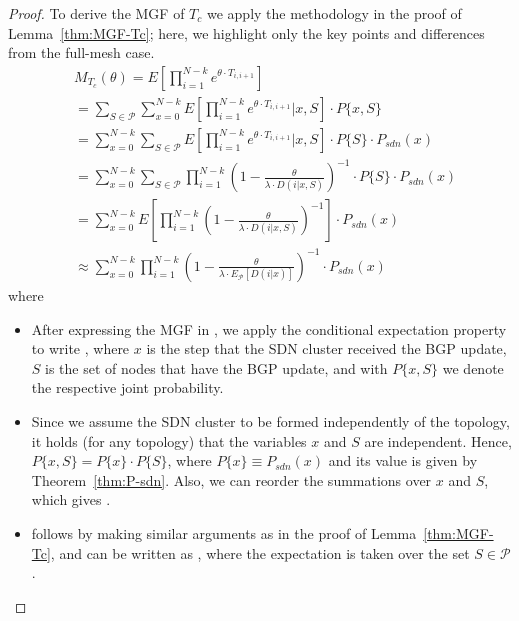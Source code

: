 \begin{proof}
To derive the MGF of $T_{c}$ we apply the methodology in the proof of Lemma~\ref{thm:MGF-Tc}; here, we highlight only the key points and differences from the full-mesh case. 
\begin{align}
&M_{T_{c}}(\theta) 
 = E\left[\prod_{i =1}^{N-k} e^{\theta\cdot T_{i,i+1}}\right] \label{eq:mgf-expectation-of-product-poisson}\\
& = \sum_{S\in\mathcal{P}}\sum_{x=0}^{N-k} E\left[\prod_{i =1}^{N-k} e^{\theta\cdot T_{i,i+1}} \Big| x,S\right] \cdot P\{x,S\} \label{eq:mgf-conditional-expectation-poisson}\\
& = \sum_{x=0}^{N-k}\sum_{S\in\mathcal{P}} E\left[\prod_{i =1}^{N-k} e^{\theta\cdot T_{i,i+1}} \Big| x,S\right] \cdot P\{S\}\cdot P_{sdn}(x) \label{eq:mgf-conditional-expectation-independent-Psdn-poisson}\\
& = \sum_{x=0}^{N-k}\sum_{S\in\mathcal{P}} \prod_{i =1}^{N-k} \left(1-\frac{\theta}{\lambda \cdot D(i|x,S)}\right)^{-1} \cdot P\{S\}\cdot P_{sdn}(x) \label{eq:mgf-conditional-expectation-product-poisson}\\
& = \sum_{x=0}^{N-k} E\left[ \prod_{i =1}^{N-k} \left(1-\frac{\theta}{\lambda \cdot D(i|x,S)}\right)^{-1} \right]\cdot P_{sdn}(x) \label{eq:mgf-expectation-over-S-poisson}\\
& \approx \sum_{x=0}^{N-k} \prod_{i =1}^{N-k} \left(1-\frac{\theta}{\lambda \cdot E_{\mathcal{P}}[D(i|x)]}\right)^{-1} \cdot P_{sdn}(x) \label{eq:mgf-conditional-expectation-product-average-D-poisson}
\end{align}
where
\begin{itemize}
\item After expressing the MGF in , we apply the conditional expectation property to write , where $x$ is the step that the SDN cluster received the BGP update, $S$ is the set of nodes that have the BGP update, and with $P\{x,S\}$ we denote the respective joint probability.
\item Since we assume the SDN cluster to be formed independently of the topology, it holds (for any topology) that the variables $x$ and $S$ are independent. Hence, $P\{x,S\} = P\{x\}\cdot P\{S\}$, where $P\{x\}\equiv P_{sdn}(x)$ and its value is given by Theorem~\ref{thm:P-sdn}. Also, we can reorder the summations over $x$ and $S$, which gives .
\item {} follows by making similar arguments as in the proof of Lemma~\ref{thm:MGF-Tc}, and can be written as , where the expectation is taken over the set $S\in\mathcal{P}$. 

\end{itemize}
\end{proof}
